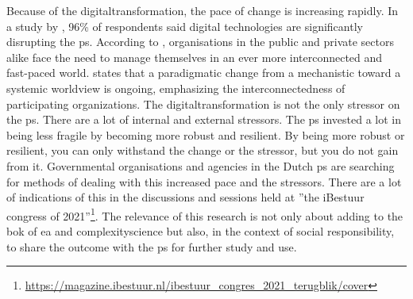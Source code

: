 Because of the \gls{digitaltransformation}, the pace of change is increasing rapidly. In a study by \textcite{Eggers2015}, 96\% of respondents said digital technologies are significantly disrupting the \gls{ps}. According to \textcite{Nurmi2021}, organisations in the public and private sectors alike face the need to manage themselves in an ever more interconnected and fast-paced world. \textcite{Guggenberger2020} states that a paradigmatic change from a mechanistic toward a systemic worldview is ongoing, emphasizing the interconnectedness of participating organizations. The \gls{digitaltransformation} is not the only \gls{stressor} on the \gls{ps}. There are a lot of internal and external \glspl{stressor}. The \gls{ps} invested a lot in being less \gls{fragile} by becoming more \gls{robust} and \gls{resilient}. By being more \gls{robust} or \gls{resilient}, you can only withstand the change or the \gls{stressor}, but you do not gain from it. Governmental organisations and agencies in the Dutch \gls{ps} are searching for methods of dealing with this increased pace and the stressors. There are a lot of indications of this in the discussions and sessions held at ''the iBestuur congress of 2021''\footnote{\url{https://magazine.ibestuur.nl/ibestuur_congres_2021_terugblik/cover}}. The relevance of this research is not only about adding to the \acrshort{bok} of \acrshort{ea} and \gls{complexityscience} but also, in the context of social responsibility, to share the outcome with the \gls{ps} for further study and use.